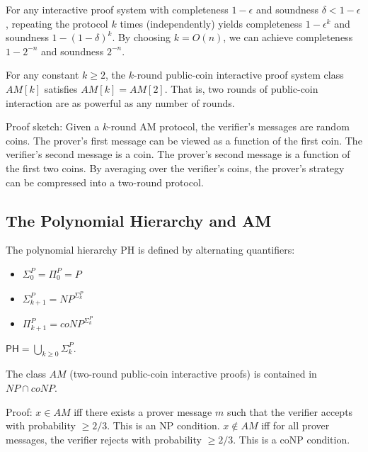 \begin{theorem}
For any interactive proof system with completeness $1-\epsilon$ and soundness $\delta < 1-\epsilon$, repeating the protocol $k$ times (independently) yields completeness $1-\epsilon^k$ and soundness $1-(1-\delta)^k$. By choosing $k = O(n)$, we can achieve completeness $1 - 2^{-n}$ and soundness $2^{-n}$.
\end{theorem}

\begin{theorem}
For any constant $k \ge 2$, the $k$-round public-coin interactive proof system class $AM[k]$ satisfies $AM[k] = AM[2]$. That is, two rounds of public-coin interaction are as powerful as any number of rounds.

Proof sketch: Given a $k$-round AM protocol, the verifier's messages are random coins. The prover's first message can be viewed as a function of the first coin. The verifier's second message is a coin. The prover's second message is a function of the first two coins. By averaging over the verifier's coins, the prover's strategy can be compressed into a two-round protocol.
\end{theorem}

\subsection{The Polynomial Hierarchy and AM}

\begin{definition}
The polynomial hierarchy PH is defined by alternating quantifiers:
\begin{itemize}
\item $\Sigma_0^P = \Pi_0^P = P$
\item $\Sigma_{k+1}^P = NP^{\Sigma_k^P}$
\item $\Pi_{k+1}^P = coNP^{\Sigma_k^P}$
\end{itemize}
$\mathsf{PH} = \bigcup_{k \ge 0} \Sigma_k^P$.
\end{definition}

\begin{theorem}
The class $AM$ (two-round public-coin interactive proofs) is contained in $NP \cap coNP$.

Proof: $x \in AM$ iff there exists a prover message $m$ such that the verifier accepts with probability $\ge 2/3$. This is an NP condition. $x \notin AM$ iff for all prover messages, the verifier rejects with probability $\ge 2/3$. This is a coNP condition.
\end{theorem}

